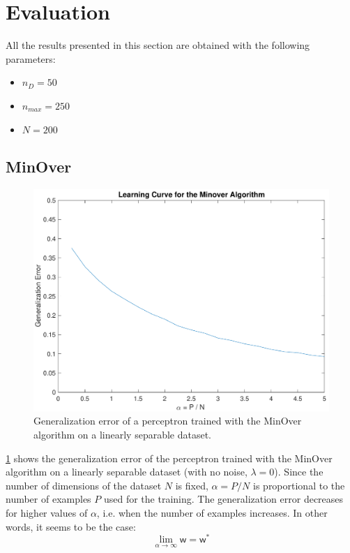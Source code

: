 \section{Evaluation}
\label{sec:evaluation}

All the results presented in this section are obtained with the following parameters:
\begin{itemize}
    \item $n_D = 50$
    \item $n_{max} = 250$
    \item $N = 200$
\end{itemize}

\subsection{MinOver}
\begin{figure}[t]
	\centering
	\includegraphics[width=\columnwidth]{figures/base}
    \caption{Generalization error of a perceptron trained with the MinOver algorithm on a linearly separable dataset.}
	\label{fig:base}
\end{figure}

\cref{fig:base} shows the generalization error of the perceptron trained with the MinOver algorithm on a linearly separable dataset (with no noise, $\lambda = 0$).
Since the number of dimensions of the dataset $N$ is fixed, $\alpha = P / N$ is proportional to the number of examples $P$ used for the training.
The generalization error decreases for higher values of $\alpha$, i.e. when the number of examples increases.
In other words, it seems to be the case:
$$\lim_{\alpha \to \infty} \bm{\mathsf{w}} = \bm{\mathsf{w}}^{*}$$

